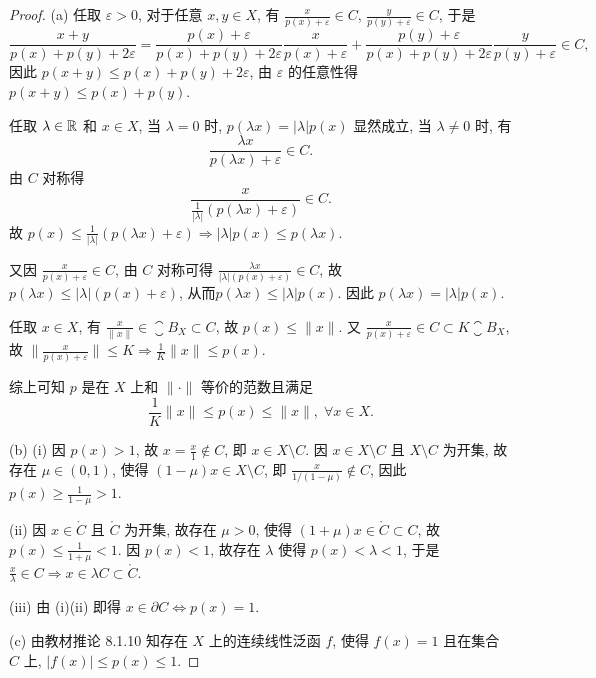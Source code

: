 \begin{proof}
    (a) 任取 $\varepsilon>0$, 对于任意 $x,y\in X$, 有 $\frac{x}{p(x)+\varepsilon}\in C$, $\frac{y}{p(y)+\varepsilon}\in C$, 于是
    \[\frac{x + y}{p(x) + p(y) + 2\varepsilon} = \frac{p(x) + \varepsilon}{p(x) + p(y) + 2\varepsilon}\frac{x}{p(x) + \varepsilon} + \frac{p(y) + \varepsilon}{p(x) + p(y) + 2\varepsilon}\frac{y}{p(y) + \varepsilon}\in C,\]
    因此 $p(x+y)\leq p(x)+p(y)+2\varepsilon$, 由 $\varepsilon$ 的任意性得 $p(x+y)\leq p(x)+p(y)$.

    任取 $\lambda\in\mathbb{R}$ 和 $x\in X$, 当 $\lambda=0$ 时, $p(\lambda x)=|\lambda|p(x)$
    显然成立, 当 $\lambda\neq 0$ 时, 有
    \[\frac{\lambda x}{p(\lambda x)+\varepsilon}\in C.\]
    由 $C$ 对称得
    \[\frac{x}{\frac{1}{|\lambda|}(p(\lambda x)+\varepsilon)}\in C.\]
    故 $p(x)\leq\frac{1}{|\lambda|}(p(\lambda x)+\varepsilon)\Rightarrow|\lambda|p(x)\leq p(\lambda x)$.

    又因 $\frac{x}{p(x)+\varepsilon}\in C$, 由 $C$ 对称可得 $\frac{\lambda x}{|\lambda|(p(x)+\varepsilon)}\in C$,
    故 $p(\lambda x)\leq |\lambda|(p(x)+\varepsilon)$, 从而$p(\lambda x)\leq|\lambda|p(x)$.
    因此 $p(\lambda x)=|\lambda|p(x)$.

    任取 $x\in X$, 有 $\frac{x}{\|x\|}\in\closure{B}_X\subset C$, 故 $p(x)\leq\|x\|$.
    又 $\frac{x}{p(x)+\varepsilon}\in C\subset K\closure{B}_X$, 故
    $\|\frac{x}{p(x)+\varepsilon}\|\leq K\Rightarrow \frac{1}{K}\|x\|\leq p(x)$.

    综上可知 $p$ 是在 $X$ 上和 $\|\cdot\|$ 等价的范数且满足
    \[\frac{1}{K}\|x\|\leq p(x)\leq\|x\|,\;\forall x\in X.\]

    (b) (i) \sufficient 因 $p(x)>1$, 故 $x=\frac{x}{1}\notin C$, 即 $x\in X\setminus C$.
    \necessary 因 $x\in X\setminus C$ 且 $X\setminus C$ 为开集,
    故存在 $\mu\in(0,1)$, 使得 $(1-\mu)x\in X\setminus C$, 即 $\frac{x}{1/(1-\mu)}\notin C$,
    因此 $p(x)\geq\frac{1}{1-\mu}>1$.

    (ii) \necessary 因 $x\in\mathring{C}$ 且 $\mathring{C}$ 为开集,
    故存在 $\mu>0$, 使得 $(1+\mu)x\in\mathring{C}\subset C$, 故 $p(x)\leq\frac{1}{1+\mu}<1$.
    \sufficient 因 $p(x)<1$, 故存在 $\lambda$ 使得 $p(x)<\lambda<1$,
    于是 $\frac{x}{\lambda}\in C\Rightarrow x\in\lambda C\subset\mathring{C}$.

    (iii) 由 (i)(ii) 即得 $x\in\partial C\Longleftrightarrow p(x)=1$.

    (c) 由教材推论 8.1.10 知存在 $X$ 上的连续线性泛函 $f$, 使得 $f(x)=1$ 且在集合 $C$ 上, $|f(x)|\leq p(x)\leq 1$.
\end{proof}



